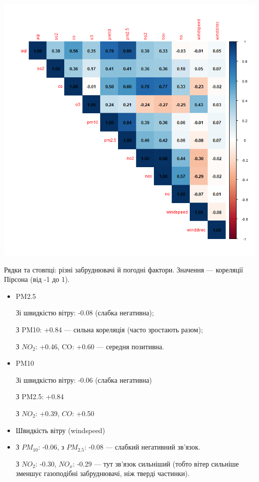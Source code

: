 \documentclass{article}
\begin{document}
\begin{enumerate}
    \includegraphics[width=6in]{plots/question1/corr_matrix_plot.png}

    Рядки та стовпці: різні забруднювачі й погодні фактори. Значення — кореляції Пірсона (від -1 до 1).
    \begin{itemize}
        \item PM2.5

        Зі швидкістю вітру: -0.08 (слабка негативна);

        З PM10: +0.84 — сильна кореляція (часто зростають разом);

        З $NO_2$: +0.46, CO: +0.60 — середня позитивна.
    \item PM10
 
        Зі швидкістю вітру: -0.06 (слабка негативна)

        З PM2.5: +0.84

        З $NO_2$: +0.39, $CO$: +0.50

    \item Швидкість вітру (windspeed)
    \item 
        З $PM_{10}$: -0.06, з $PM_{2.5}$: -0.08 — слабкий негативний зв'язок.

        З $NO_2$: -0.30, $NO_x$: -0.29 — тут зв'язок сильніший (тобто вітер сильніше зменшує газоподібні забруднювачі, ніж тверді частинки).


\end{itemize}
\end{enumerate}
\end{document}
